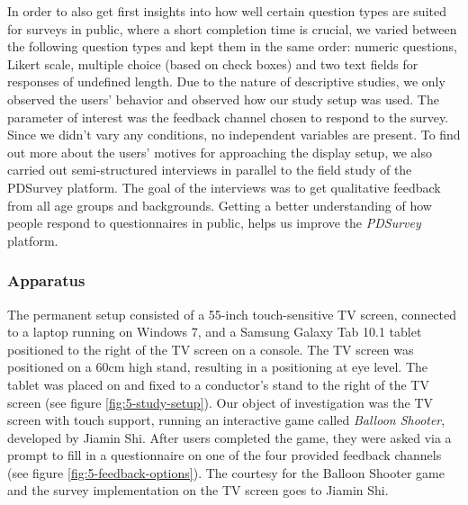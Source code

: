
	In order to also get first insights into how well certain question types are suited for surveys in public, where a short completion time is crucial, we varied between the following question types and kept them in the same order: numeric questions, Likert scale, multiple choice (based on check boxes) and two text fields for responses of undefined length. 
	Due to the nature of descriptive studies, we only observed the users' behavior and observed how our study setup was used. The parameter of interest was the feedback channel chosen to respond to the survey. Since we didn't vary any conditions, no independent variables are present.
	To find out more about the users' motives for approaching the display setup, we also carried out semi-structured interviews in parallel to the field study of the PDSurvey platform. The goal of the interviews was to get qualitative feedback from all age groups and backgrounds. Getting a better understanding of how people respond to questionnaires in public, helps us improve the \textit{PDSurvey} platform.





	\subsubsection{Apparatus}
	\label{chapter:field-study:apparatus}

		The permanent setup consisted of a 55-inch touch-sensitive TV screen, connected to a laptop running on Windows 7, and a Samsung Galaxy Tab 10.1 tablet positioned to the right of the TV screen on a console. The TV screen was positioned on a 60cm high stand, resulting in a positioning at eye level. The tablet was placed on and fixed to a conductor's stand to the right of the TV screen (see figure \ref{fig:5-study-setup}). Our object of investigation was the TV screen with touch support, running an interactive game called \textit{Balloon Shooter}, developed by Jiamin Shi. After users completed the game, they were asked via a prompt to fill in a questionnaire on one of the four provided feedback channels (see figure \ref{fig:5-feedback-options}). The courtesy for the Balloon Shooter game and the survey implementation on the TV screen goes to Jiamin Shi.

